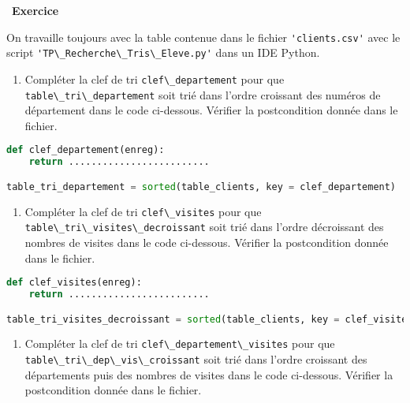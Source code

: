 \documentclass[
  11pt,
]{article}
\newcommand{\passthrough}[1]{#1}
\providecommand{\tightlist}{%
  \setlength{\itemsep}{0pt}\setlength{\parskip}{0pt}}
\newcounter{exo}
\newenvironment{exercice}[1]
{\par \medskip   \addtocounter{exo}{1} \noindent  
\begin{bclogo}[arrondi =0.1,   noborder = true, logo=\bccrayon, marge=4]{~\textbf{Exercice} \textbf{\theexo} {\itshape #1} }  \par}
{
\end{bclogo}
 \par \bigskip }
\newcounter{def}
\begin{document}
\begin{exercice}{}

On travaille toujours avec la table contenue dans le fichier
\passthrough{\lstinline!'clients.csv'!} avec le script
\passthrough{\lstinline!'TP\_Recherche\_Tris\_Eleve.py'!} dans un IDE
Python.

\begin{enumerate}
\def\labelenumi{\arabic{enumi}.}
\tightlist
\item
  Compléter la clef de tri \passthrough{\lstinline!clef\_departement!}
  pour que \passthrough{\lstinline!table\_tri\_departement!} soit trié
  dans l'ordre croissant des numéros de département dans le code
  ci-dessous. Vérifier la postcondition donnée dans le fichier.
\end{enumerate}

\begin{lstlisting}[language=Python]
def clef_departement(enreg):
    return .........................

table_tri_departement = sorted(table_clients, key = clef_departement)
\end{lstlisting}

\begin{enumerate}
\def\labelenumi{\arabic{enumi}.}
\setcounter{enumi}{1}
\tightlist
\item
  Compléter la clef de tri \passthrough{\lstinline!clef\_visites!} pour
  que \passthrough{\lstinline!table\_tri\_visites\_decroissant!} soit
  trié dans l'ordre décroissant des nombres de visites dans le code
  ci-dessous. Vérifier la postcondition donnée dans le fichier.
\end{enumerate}

\begin{lstlisting}[language=Python]
def clef_visites(enreg):
    return .........................

table_tri_visites_decroissant = sorted(table_clients, key = clef_visites, reverse = True)
\end{lstlisting}

\begin{enumerate}
\def\labelenumi{\arabic{enumi}.}
\setcounter{enumi}{2}
\tightlist
\item
  Compléter la clef de tri
  \passthrough{\lstinline!clef\_departement\_visites!} pour que
  \passthrough{\lstinline!table\_tri\_dep\_vis\_croissant!} soit trié
  dans l'ordre croissant des départements puis des nombres de visites
  dans le code ci-dessous. Vérifier la postcondition donnée dans le
  fichier.
\end{enumerate}


\end{exercice}
\end{document}
